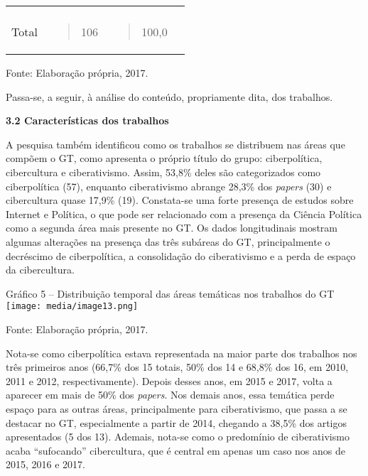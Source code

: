 \begin{longtable}[]{@{}llll@{}}
\begin{minipage}[t]{0.24\columnwidth}
\strut
\end{minipage}\tabularnewline
\begin{minipage}[t]{0.24\columnwidth}\raggedright\strut
Total\strut
\end{minipage} & \begin{minipage}[t]{0.24\columnwidth}\raggedright\strut
\begin{quote}
106
\end{quote}\strut
\end{minipage} & \begin{minipage}[t]{0.24\columnwidth}\raggedright\strut
\begin{quote}
100,0
\end{quote}\strut
\end{minipage} & \begin{minipage}[t]{0.24\columnwidth}\raggedright\strut
\strut
\end{minipage}\tabularnewline
\bottomrule
\end{longtable}

Fonte: Elaboração própria, 2017.

Passa-se, a seguir, à análise do conteúdo, propriamente dita, dos
trabalhos.

\textbf{3.2 Características dos trabalhos }

A pesquisa também identificou como os trabalhos se distribuem nas áreas
que compõem o GT, como apresenta o próprio título do grupo:
ciberpolítica, cibercultura e ciberativismo. Assim, 53,8\% deles são
categorizados como ciberpolítica (57), enquanto ciberativismo abrange
28,3\% dos \emph{papers} (30) e cibercultura quase 17,9\% (19).
Constata-se uma forte presença de estudos sobre Internet e Política, o
que pode ser relacionado com a presença da Ciência Política como a
segunda área mais presente no GT. Os dados longitudinais mostram algumas
alterações na presença das três subáreas do GT, principalmente o
decréscimo de ciberpolítica, a consolidação do ciberativismo e a perda
de espaço da cibercultura.

Gráfico 5 -- Distribuição temporal das áreas temáticas nos trabalhos do
GT \texttt{[image: media/image13.png]}

Fonte: Elaboração própria, 2017.

Nota-se como ciberpolítica estava representada na maior parte dos
trabalhos nos três primeiros anos (66,7\% dos 15 totais, 50\% dos 14 e
68,8\% dos 16, em 2010, 2011 e 2012, respectivamente). Depois desses
anos, em 2015 e 2017, volta a aparecer em mais de 50\% dos
\emph{papers}. Nos demais anos, essa temática perde espaço para as
outras áreas, principalmente para ciberativismo, que passa a se destacar
no GT, especialmente a partir de 2014, chegando a 38,5\% dos artigos
apresentados (5 dos 13). Ademais, nota-se como o predomínio de
ciberativismo acaba ``sufocando'' cibercultura, que é central em apenas
um caso nos anos de 2015, 2016 e 2017.

